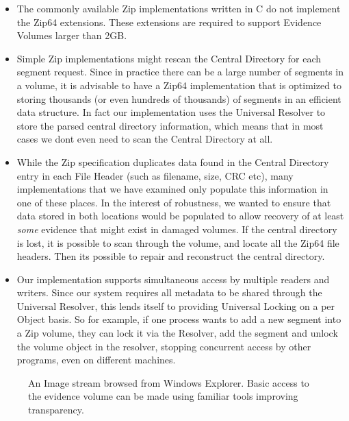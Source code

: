 \documentclass[10pt, conference]{IEEEtran}
\begin{document}
\begin{itemize}
\item The commonly available Zip implementations written in C do not
 implement the Zip64 extensions. These extensions are required to
 support Evidence Volumes larger than 2GB.

\item Simple Zip implementations might rescan the
  Central Directory for each segment request. Since in practice there
  can be a large number of segments in a volume, it is advisable to
  have a Zip64 implementation that is optimized to storing thousands
  (or even hundreds of thousands) of segments in an efficient data
  structure. In fact our implementation uses the Universal Resolver to
  store the parsed central directory information, which means that in
  most cases we dont even need to scan the Central Directory at all.

\item While the Zip specification duplicates data found in the Central
  Directory entry in each File Header (such as filename, size, CRC
  etc), many implementations that we have examined only populate this
  information in one of these places. In the interest of robustness,
  we wanted to ensure that data stored in both locations would be
  populated to allow recovery of at least \emph{some} evidence that
  might exist in damaged volumes. If the central directory is lost, it
  is possible to scan through the volume, and locate all the Zip64
  file headers. Then its possible to repair and reconstruct the
  central directory.

\item Our implementation supports simultaneous access by multiple
  readers and writers. Since our system requires all metadata to be
  shared through the Universal Resolver, this lends itself to
  providing Universal Locking on a per Object basis. So for example,
  if one process wants to add a new segment into a Zip volume, they
  can lock it via the Resolver, add the segment and unlock the volume
  object in the resolver, stopping concurrent access by other
  programs, even on different machines.
\end{itemize}

\begin{figure}[tbp]
  \begin{center}
  \mbox{\columnwidth {}}

  \caption{An Image stream browsed from Windows Explorer.  Basic
  access to the evidence volume can be made using familiar tools
  improving transparency.}

  \label{explorer}
  \end{center}
\end{figure}
\end{document}
